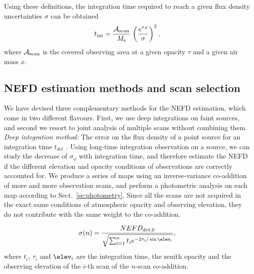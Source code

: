 Using these definitions, the integration time required to reach a given
flux density uncertainties $\sigma$ can be obtained
\begin{equation}
  t_{\rm{int}} =  \frac{\mathcal{A}_{\rm{scan}}}{ M_{\rm{s}}} \, \left(\frac{e^{\tau x}}{\sigma}\right)^2,
\end{equation}
where $\mathcal{A}_{\rm{scan}}$ is the covered observing area at a
given opacity $\tau$ and a given air mass $x$.





\subsection{NEFD estimation methods and scan selection}
\label{se:nefd_method}

We have devised three complementary methods for the
NEFD estimation, which come in two different flavours. First, we
use deep integrations on faint sources, and second we resort to 
joint analysis of multiple scans without combining them.\\

\noindent \emph{Deep integration method:} The error on the flux density of a
point source for an integration time $t_{det}$ . Using long-time integration observation on a source,
we can study the decrease of $\sigma_\phi$ with integration time, and
therefore estimate the NEFD if the different elevation and opacity conditions of
observations are correctly accounted for.  We produce a series of maps using an
inverse-variance co-addition of more and more observation scans, and perform a
photometric analysis on each map according to Sect.~\ref{se:photometry}. Since
all the scans are not acquired in the exact same conditions of atmospheric
opacity and observing elevation, they do not contribute with the same weight to
the co-addition. 

\begin{equation}
  \sigma(n) = \frac{NEFD_{det,0}}{\sqrt{\sum_{i=1}^{n}t_i e^{-2\tau_i/\sin\elev_i}}},
  \label{eq:sigma_tau_w8}
\end{equation}
where $t_i$, $\tau_i$ and $\elev_i$ are the integration time, the zenith
opacity and the observing elevation of the $i$-th scan of the $n$-scan
co-addition. \\

